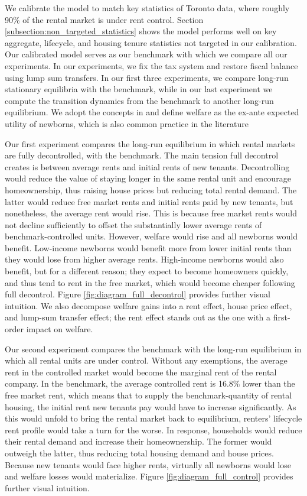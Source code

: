 \documentclass[parskip=full]{article}
\begin{document}
We calibrate the model to match key statistics of Toronto data, where roughly 90\% of the rental market is under rent control. Section \ref{subsection:non_targeted_statistics} shows the model performs well on key aggregate, lifecycle, and housing tenure statistics not targeted in our calibration. Our calibrated model serves as our benchmark with which we compare all our experiments. In our experiments, we fix the tax system and restore fiscal balance using lump sum transfers. In our first three experiments, we compare long-run stationary equilibria with the benchmark, while in our last experiment we compute the transition dynamics from the benchmark to another long-run equilibrium. We adopt the concepts in \citet{ralws-1971} and define welfare as the ex-ante expected utility of newborns, which is also common practice in the literature \citep{conesa-et-al,gkkoc}

Our first experiment compares the long-run equilibrium in which rental markets are fully decontrolled, with the benchmark. The main tension full decontrol creates is between average rents and initial rents of new tenants. Decontrolling would reduce the value of staying longer in the same rental unit and encourage homeownership, thus raising house prices but reducing total rental demand. The latter would reduce free market rents and initial rents paid by new tenants, but nonetheless, the average rent would rise. This is because free market rents would not decline sufficiently to offset the substantially lower average rents of benchmark-controlled units. However, welfare would rise and all newborns would benefit. Low-income newborns would benefit more from lower initial rents than they would lose from higher average rents. High-income newborns would also benefit, but for a different reason; they expect to become homeowners quickly, and thus tend to rent in the free market, which would become cheaper following full decontrol. Figure \ref{fig:diagram_full_decontrol} provides further visual intuition. We also decompose welfare gains into a rent effect, house price effect, and lump-sum transfer effect; the rent effect stands out as the one with a first-order impact on welfare. 

Our second experiment compares the benchmark with the long-run equilibrium in which all rental units are under control. Without any exemptions, the average rent in the controlled market would become the marginal rent of the rental company. In the benchmark, the average controlled rent is 16.8\% lower than the free market rent, which means that to supply the benchmark-quantity of rental housing, the initial rent new tenants pay would have to increase significantly. As this would unfold to bring the rental market back to equilibrium, renters' lifecycle rent profile would take a turn for the worse. In response, households would reduce their rental demand and increase their homeownership. The former would outweigh the latter, thus reducing total housing demand and house prices. Because new tenants would face higher rents, virtually all newborns would lose and welfare losses would materialize. Figure \ref{fig:diagram_full_control} provides further visual intuition.
\end{document}
